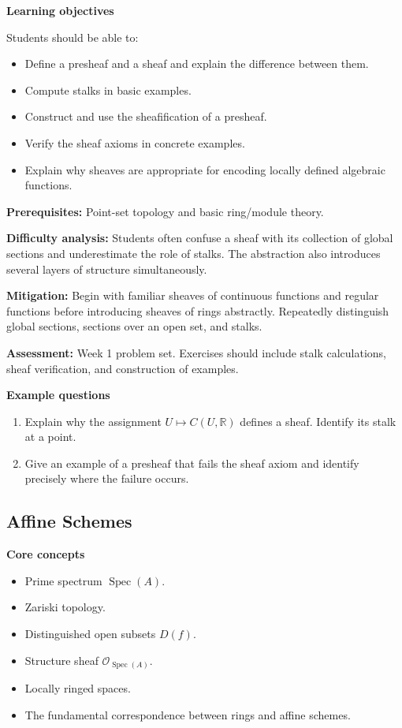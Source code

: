 \documentclass[11pt]{article}
\begin{document}
\textbf{Learning objectives}

Students should be able to:
\begin{itemize}
    \item Define a presheaf and a sheaf and explain the difference between them.
    \item Compute stalks in basic examples.
    \item Construct and use the sheafification of a presheaf.
    \item Verify the sheaf axioms in concrete examples.
    \item Explain why sheaves are appropriate for encoding locally defined algebraic functions.
\end{itemize}

\textbf{Prerequisites:} Point-set topology and basic ring/module theory.

\textbf{Difficulty analysis:} Students often confuse a sheaf with its collection of global sections and underestimate the role of stalks. The abstraction also introduces several layers of structure simultaneously.

\textbf{Mitigation:} Begin with familiar sheaves of continuous functions and regular functions before introducing sheaves of rings abstractly. Repeatedly distinguish global sections, sections over an open set, and stalks.

\textbf{Assessment:} Week 1 problem set. Exercises should include stalk calculations, sheaf verification, and construction of examples.

\textbf{Example questions}
\begin{enumerate}
    \item Explain why the assignment $U \mapsto C(U,\mathbb{R})$ defines a sheaf. Identify its stalk at a point.
    \item Give an example of a presheaf that fails the sheaf axiom and identify precisely where the failure occurs.
\end{enumerate}

\subsection{Affine Schemes}

\textbf{Core concepts}
\begin{itemize}
    \item Prime spectrum $\operatorname{Spec}(A)$.
    \item Zariski topology.
    \item Distinguished open subsets $D(f)$.
    \item Structure sheaf $\mathcal{O}_{\operatorname{Spec}(A)}$.
    \item Locally ringed spaces.
    \item The fundamental correspondence between rings and affine schemes.
\end{itemize}
\end{document}
